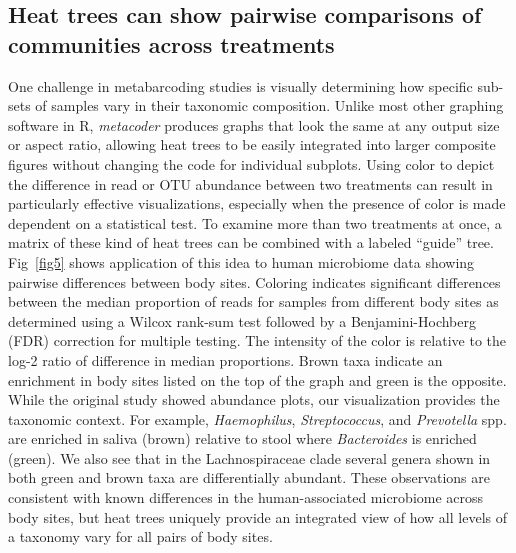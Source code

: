 \documentclass[10pt,letterpaper]{article}
\begin{document}
\subsection*{Heat trees can show pairwise comparisons of communities
	across
	treatments}\label{heat-trees-can-show-pairwise-comparisons-of-communities-across-treatments}

One challenge in metabarcoding studies is visually determining how
specific sub-sets of samples vary in their taxonomic composition. Unlike
most other graphing software in R, \emph{metacoder} produces graphs that
look the same at any output size or aspect ratio, allowing heat trees to
be easily integrated into larger composite figures without changing the
code for individual subplots. Using color to depict the difference in
read or OTU abundance between two treatments can result in particularly
effective visualizations, especially when the presence of color is made
dependent on a statistical test. To examine more than two treatments at
once, a matrix of these kind of heat trees can be combined with a
labeled ``guide'' tree. Fig~\ref{fig5} shows application of this idea to human
microbiome data showing pairwise differences between body sites.
Coloring indicates significant differences between the median proportion
of reads for samples from different body sites as determined using a
Wilcox rank-sum test followed by a Benjamini-Hochberg (FDR) correction
for multiple testing. The intensity of the color is relative to the
log-2 ratio of difference in median proportions. Brown taxa indicate an
enrichment in body sites listed on the top of the graph and green is the
opposite. While the original study \cite{human2012structure} showed
abundance plots, our visualization provides the taxonomic context. For
example, \emph{Haemophilus}, \emph{Streptococcus}, and \emph{Prevotella}
spp. are enriched in saliva (brown) relative to stool where
\emph{Bacteroides} is enriched (green). We also see that in the
Lachnospiraceae clade several genera shown in both green and brown taxa
are differentially abundant. These observations are consistent with
known differences in the human-associated microbiome across body sites,
but heat trees uniquely provide an integrated view of how all levels of
a taxonomy vary for all pairs of body sites.
\end{document}
